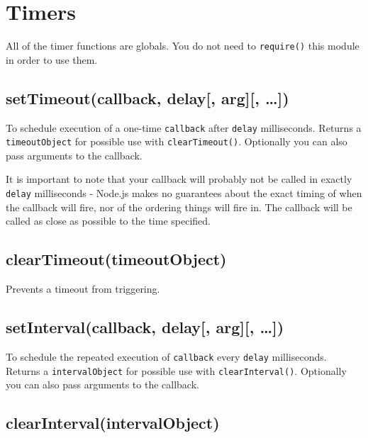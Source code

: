 \section{Timers}\label{timers}

\begin{Shaded}
\begin{Highlighting}[]
 
\end{Highlighting}
\end{Shaded}

All of the timer functions are globals. You do not need to
\texttt{require()} this module in order to use them.

\subsection{setTimeout(callback, delay{[}, arg{]}{[},
\ldots{}{]})}\label{settimeoutcallback-delay-arg}

To schedule execution of a one-time \texttt{callback} after
\texttt{delay} milliseconds. Returns a \texttt{timeoutObject} for
possible use with \texttt{clearTimeout()}. Optionally you can also pass
arguments to the callback.

It is important to note that your callback will probably not be called
in exactly \texttt{delay} milliseconds - Node.js makes no guarantees
about the exact timing of when the callback will fire, nor of the
ordering things will fire in. The callback will be called as close as
possible to the time specified.

\subsection{clearTimeout(timeoutObject)}\label{cleartimeouttimeoutobject}

Prevents a timeout from triggering.

\subsection{setInterval(callback, delay{[}, arg{]}{[},
\ldots{}{]})}\label{setintervalcallback-delay-arg}

To schedule the repeated execution of \texttt{callback} every
\texttt{delay} milliseconds. Returns a \texttt{intervalObject} for
possible use with \texttt{clearInterval()}. Optionally you can also pass
arguments to the callback.

\subsection{clearInterval(intervalObject)}\label{clearintervalintervalobject}

